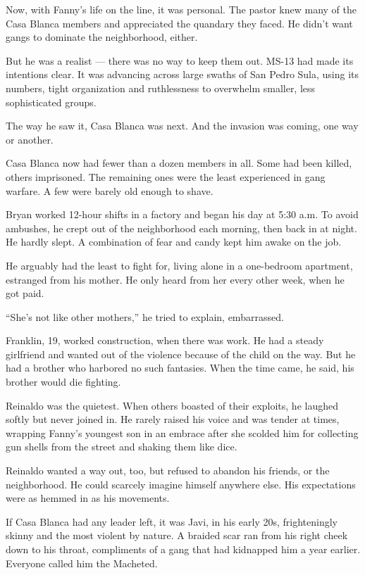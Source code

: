 Now, with Fanny's life on the line, it was personal. The pastor knew
many of the Casa Blanca members and appreciated the quandary they faced.
He didn't want gangs to dominate the neighborhood, either.

But he was a realist --- there was no way to keep them out. MS-13 had
made its intentions clear. It was advancing across large swaths of San
Pedro Sula, using its numbers, tight organization and ruthlessness to
overwhelm smaller, less sophisticated groups.

The way he saw it, Casa Blanca was next. And the invasion was coming,
one way or another.

Casa Blanca now had fewer than a dozen members in all. Some had been
killed, others imprisoned. The remaining ones were the least experienced
in gang warfare. A few were barely old enough to shave.

Bryan worked 12-hour shifts in a factory and began his day at 5:30 a.m.
To avoid ambushes, he crept out of the neighborhood each morning, then
back in at night. He hardly slept. A combination of fear and candy kept
him awake on the job.

He arguably had the least to fight for, living alone in a one-bedroom
apartment, estranged from his mother. He only heard from her every other
week, when he got paid.

``She's not like other mothers,'' he tried to explain, embarrassed.

Franklin, 19, worked construction, when there was work. He had a steady
girlfriend and wanted out of the violence because of the child on the
way. But he had a brother who harbored no such fantasies. When the time
came, he said, his brother would die fighting.

Reinaldo was the quietest. When others boasted of their exploits, he
laughed softly but never joined in. He rarely raised his voice and was
tender at times, wrapping Fanny's youngest son in an embrace after she
scolded him for collecting gun shells from the street and shaking them
like dice.

Reinaldo wanted a way out, too, but refused to abandon his friends, or
the neighborhood. He could scarcely imagine himself anywhere else. His
expectations were as hemmed in as his movements.

If Casa Blanca had any leader left, it was Javi, in his early 20s,
frighteningly skinny and the most violent by nature. A braided scar ran
from his right cheek down to his throat, compliments of a gang that had
kidnapped him a year earlier. Everyone called him the Macheted.

